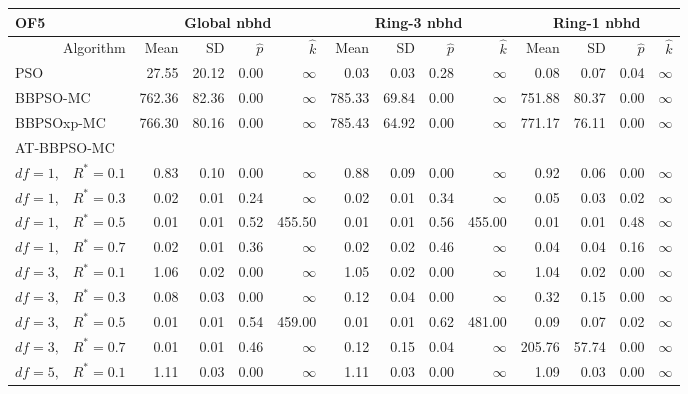 \documentclass[cmbright]{staauth}
\begin{document}
\begin{table}[ht]
\centering
\tiny{
\begin{tabular}{r|rrrr|rrrr|rrrr}
\multicolumn{1}{l}{OF5} & \multicolumn{4}{c}{Global nbhd} & \multicolumn{4}{c}{Ring-3 nbhd} & \multicolumn{4}{c}{Ring-1 nbhd}\\
  \hline
Algorithm & Mean & SD & $\widehat{p}$ & $\widehat{k}$ & Mean & SD & $\widehat{p}$ & $\widehat{k}$ & Mean & SD & $\widehat{p}$ & $\widehat{k}$ \\
  \hline
\multicolumn{1}{l|}{PSO} & 27.55 & 20.12 & 0.00 & $\infty$ & 0.03 & 0.03 & 0.28 & $\infty$ & 0.08 & 0.07 & 0.04 & $\infty$ \\
  \multicolumn{1}{l|}{BBPSO-MC} & 762.36 & 82.36 & 0.00 & $\infty$ & 785.33 & 69.84 & 0.00 & $\infty$ & 751.88 & 80.37 & 0.00 & $\infty$ \\
  \multicolumn{1}{l|}{BBPSOxp-MC} & 766.30 & 80.16 & 0.00 & $\infty$ & 785.43 & 64.92 & 0.00 & $\infty$ & 771.17 & 76.11 & 0.00 & $\infty$ \\
\hline
\multicolumn{1}{l|}{AT-BBPSO-MC} &&&&&&&&&&&&\\
  $df = 1,\enspace$ $R^* =0.1$ & 0.83 & 0.10 & 0.00 & $\infty$ & 0.88 & 0.09 & 0.00 & $\infty$ & 0.92 & 0.06 & 0.00 & $\infty$ \\
  $df = 1,\enspace$ $R^* =0.3$ & 0.02 & 0.01 & 0.24 & $\infty$ & 0.02 & 0.01 & 0.34 & $\infty$ & 0.05 & 0.03 & 0.02 & $\infty$ \\
  $df = 1,\enspace$ $R^* =0.5$ & 0.01 & 0.01 & 0.52 & 455.50 & 0.01 & 0.01 & 0.56 & 455.00 & 0.01 & 0.01 & 0.48 & $\infty$ \\
  $df = 1,\enspace$ $R^* =0.7$ & 0.02 & 0.01 & 0.36 & $\infty$ & 0.02 & 0.02 & 0.46 & $\infty$ & 0.04 & 0.04 & 0.16 & $\infty$ \\
  $df = 3,\enspace$ $R^* =0.1$ & 1.06 & 0.02 & 0.00 & $\infty$ & 1.05 & 0.02 & 0.00 & $\infty$ & 1.04 & 0.02 & 0.00 & $\infty$ \\
  $df = 3,\enspace$ $R^* =0.3$ & 0.08 & 0.03 & 0.00 & $\infty$ & 0.12 & 0.04 & 0.00 & $\infty$ & 0.32 & 0.15 & 0.00 & $\infty$ \\
  $df = 3,\enspace$ $R^* =0.5$ & 0.01 & 0.01 & 0.54 & 459.00 & 0.01 & 0.01 & 0.62 & 481.00 & 0.09 & 0.07 & 0.02 & $\infty$ \\
  $df = 3,\enspace$ $R^* =0.7$ & 0.01 & 0.01 & 0.46 & $\infty$ & 0.12 & 0.15 & 0.04 & $\infty$ & 205.76 & 57.74 & 0.00 & $\infty$ \\
  $df = 5,\enspace$ $R^* =0.1$ & 1.11 & 0.03 & 0.00 & $\infty$ & 1.11 & 0.03 & 0.00 & $\infty$ & 1.09 & 0.03 & 0.00 & $\infty$ \\

\end{tabular}}
\end{table}
\end{document}
